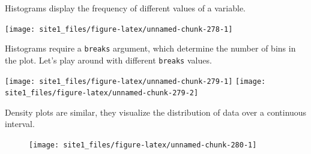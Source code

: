 \documentclass[]{book}
\newenvironment{Shaded}{\begin{snugshade}}{\end{snugshade}}
\newcommand{\KeywordTok}[1]{\textcolor[rgb]{0.13,0.29,0.53}{\textbf{#1}}}
\newcommand{\DataTypeTok}[1]{\textcolor[rgb]{0.13,0.29,0.53}{#1}}
\newcommand{\DecValTok}[1]{\textcolor[rgb]{0.00,0.00,0.81}{#1}}
\newcommand{\StringTok}[1]{\textcolor[rgb]{0.31,0.60,0.02}{#1}}
\newcommand{\CommentTok}[1]{\textcolor[rgb]{0.56,0.35,0.01}{\textit{#1}}}
\newcommand{\OperatorTok}[1]{\textcolor[rgb]{0.81,0.36,0.00}{\textbf{#1}}}
\newcommand{\AlertTok}[1]{\textcolor[rgb]{0.94,0.16,0.16}{#1}}
\newcommand{\NormalTok}[1]{#1}
\begin{document}
Histograms display the frequency of different values of a variable.

\begin{Shaded}
\end{Shaded}

\begin{center}\texttt{[image: site1\_files/figure-latex/unnamed-chunk-278-1]} \end{center}

Histograms require a \texttt{breaks} argument, which determine the
number of bins in the plot. Let's play around with different
\texttt{breaks} values.

\begin{Shaded}
\end{Shaded}

\begin{center}\texttt{[image: site1\_files/figure-latex/unnamed-chunk-279-1]} \texttt{[image: site1\_files/figure-latex/unnamed-chunk-279-2]} \end{center}

Density plots are similar, they visualize the distribution of data over
a continuous interval.

\begin{Shaded}
\end{Shaded}

\begin{figure}

{\centering \texttt{[image: site1\_files/figure-latex/unnamed-chunk-280-1]} 

}

\caption{ }\label{fig:unnamed-chunk-280}
\end{figure}
\end{document}
